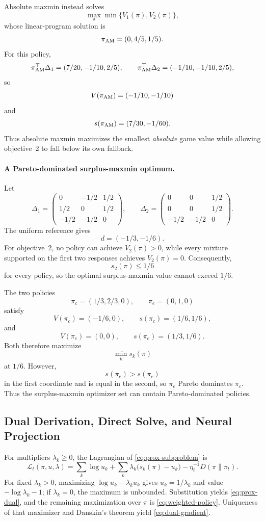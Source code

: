 \documentclass{article}
\theoremstyle{remark}
\theoremstyle{plain}
\begin{document}
Absolute maxmin instead solves
\[
\max_{\pi}\min\{V_1(\pi),V_2(\pi)\},
\]
whose linear-program solution is
\[
\pi_{\rm AM}=(0,4/5,1/5).
\]
For this policy,
\[
\pi_{\rm AM}^\top \Delta_1=(7/20,-1/10,2/5),
\qquad
\pi_{\rm AM}^\top \Delta_2=(-1/10,-1/10,2/5),
\]
so
\[
V(\pi_{\rm AM})=(-1/10,-1/10)
\]
and
\[
s(\pi_{\rm AM})
=
(7/30,-1/60).
\]
Thus absolute maxmin maximizes the smallest \emph{absolute} game value
while allowing objective~2 to fall below its own fallback.

\paragraph{A Pareto-dominated surplus-maxmin optimum.}
Let
\[
\Delta_1=
\begin{pmatrix}
0&-1/2&1/2\\
1/2&0&1/2\\
-1/2&-1/2&0
\end{pmatrix},
\qquad
\Delta_2=
\begin{pmatrix}
0&0&1/2\\
0&0&1/2\\
-1/2&-1/2&0
\end{pmatrix}.
\]
The uniform reference gives
\[
d=(-1/3,-1/6).
\]
For objective~2, no policy can achieve $V_2(\pi)>0$, while every mixture
supported on the first two responses achieves $V_2(\pi)=0$.
Consequently,
\[
s_2(\pi)\le 1/6
\]
for every policy, so the optimal surplus-maxmin value cannot exceed
$1/6$.

The two policies
\[
\pi_c=(1/3,2/3,0),
\qquad
\pi_e=(0,1,0)
\]
satisfy
\[
V(\pi_c)=(-1/6,0),
\qquad
s(\pi_c)=(1/6,1/6),
\]
and
\[
V(\pi_e)=(0,0),
\qquad
s(\pi_e)=(1/3,1/6).
\]
Both therefore maximize
\[
\min_k s_k(\pi)
\]
at $1/6$. However,
\[
s(\pi_e)>s(\pi_c)
\]
in the first coordinate and is equal in the second, so
$\pi_e$ Pareto dominates $\pi_c$. Thus the surplus-maxmin optimizer set
can contain Pareto-dominated policies.

\subsection{Dual Derivation, Direct Solve, and Neural Projection}
\label{app:prox-dual}
For multipliers $\lambda_k\ge0$, the Lagrangian of \eqref{eq:prox-subproblem} is
\[
\mathcal L_t(\pi,u,\lambda)
=
\sum_k\log u_k
+
\sum_k\lambda_k\bigl(s_k(\pi)-u_k\bigr)
-
\eta_t^{-1}D(\pi\|\pi_t).
\]
For fixed $\lambda_k>0$, maximizing $\log u_k-\lambda_ku_k$ gives $u_k=1/\lambda_k$ and value $-\log\lambda_k-1$; if $\lambda_k=0$, the maximum is unbounded. Substitution yields \eqref{eq:prox-dual}, and the remaining maximization over $\pi$ is \eqref{eq:weighted-policy}. Uniqueness of that maximizer and Danskin's theorem yield \eqref{eq:dual-gradient}.
\end{document}
